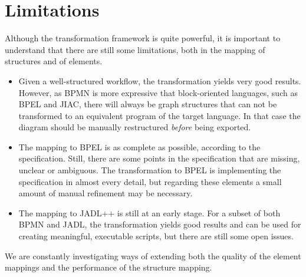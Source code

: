 
\section{Limitations}

Although the transformation framework is quite powerful, it is important to
understand that there are still some limitations, both in the mapping of
structures and of elements.

\begin{itemize}
	\item Given a well-structured workflow, the transformation yields very good
	results.  However, as BPMN is more expressive that block-oriented languages,
	such as BPEL and JIAC, there will always be graph structures that can not be
	transformed to an equivalent program of the target language.  In that case
	the diagram should be manually restructured \emph{before} being exported.

	\item The mapping to BPEL is as complete as possible, according to the
	specification.  Still, there are some points in the specification that are
	missing, unclear or ambiguous.  The transformation to BPEL is implementing
	the specification in almost every detail, but regarding these elements a small
	amount of manual refinement may be necessary.

	\item The mapping to JADL++ is still at an early stage.  For a subset of both
	BPMN and JADL, the transformation yields good results and can be used for
	creating meaningful, executable scripts, but there are still some open issues.
\end{itemize}

We are constantly investigating ways of extending both the quality of the element
mappings and the performance of the structure mapping.

